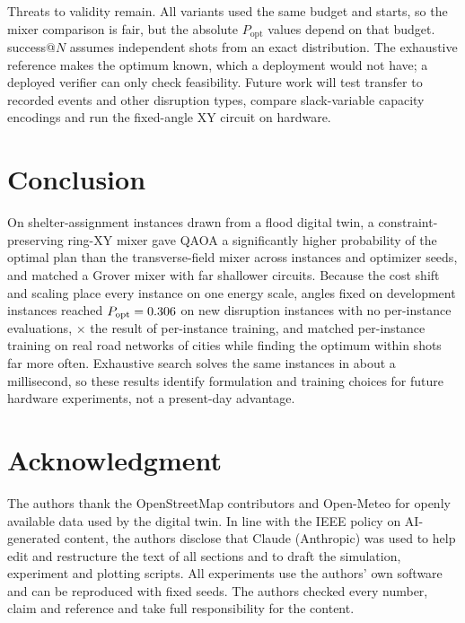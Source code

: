 \documentclass[conference]{IEEEtran}
\begin{document}
Threats to validity remain. All variants used the same budget and starts, so the mixer comparison is fair, but the absolute $P_{\mathrm{opt}}$ values depend on that budget. success@$N$ assumes independent shots from an exact distribution. The exhaustive reference makes the optimum known, which a deployment would not have; a deployed verifier can only check feasibility. Future work will test transfer to recorded events and other disruption types, compare slack-variable capacity encodings and run the fixed-angle XY circuit on hardware.

\section{Conclusion}
On shelter-assignment instances drawn from a flood digital twin, a constraint-preserving ring-XY mixer gave QAOA a significantly higher probability of the optimal plan than the transverse-field mixer across instances and optimizer seeds, and matched a Grover mixer with far shallower circuits. Because the cost shift and scaling place every instance on one energy scale, angles fixed on development instances reached $P_{\mathrm{opt}}=0.306$ on new disruption instances with no per-instance evaluations, \HoRatioFour$\times$ the result of per-instance training, and matched per-instance training on real road networks of \CityNCities{} cities while finding the optimum within \Shots{} shots far more often. Exhaustive search solves the same instances in about a millisecond, so these results identify formulation and training choices for future hardware experiments, not a present-day advantage.

\section*{Acknowledgment}
The authors thank the OpenStreetMap contributors and Open-Meteo for openly available data used by the digital twin.
In line with the IEEE policy on AI-generated content, the authors disclose that Claude (Anthropic) was used to help edit and restructure the text of all sections and to draft the simulation, experiment and plotting scripts. All experiments use the authors' own software and can be reproduced with fixed seeds. The authors checked every number, claim and reference and take full responsibility for the content.
\end{document}
